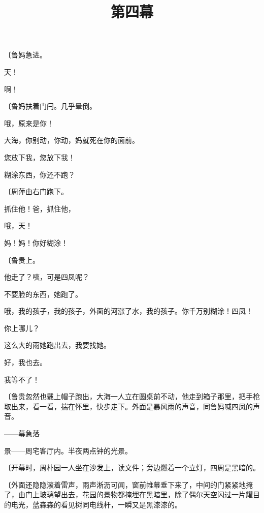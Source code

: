 {\fangsong〔鲁妈急进。}

天！

啊！

{\fangsong〔鲁妈扶着门闩。几乎晕倒。}

哦，原来是你！

大海，你别动，你动，妈就死在你的面前。

您放下我，您放下我！

糊涂东西，你还不跑？

{\fangsong〔周萍由右门跑下。}

抓住他！爸，抓住他，

哦，天！

妈！妈！你好糊涂！

{\fangsong〔鲁贵上。}

他走了？咦，可是四凤呢？

不要脸的东西，她跑了。

哦，我的孩子，我的孩子，外面的河涨了水，我的孩子。你千万别糊涂！四凤！

你上哪儿？

这么大的雨她跑出去，我要找她。

好，我也去。

我等不了！

{\fangsong〔鲁贵忽然也戴上帽子跑出，大海一人立在圆桌前不动，他走到箱子那里，把手枪取出来，看一看，揣在怀里，快步走下。外面是暴风雨的声音，同鲁妈喊四凤的声音。}

——幕急落

\title{第四幕}

景——周宅客厅内。半夜两点钟的光景。

{\fangsong〔开幕时，周朴园一人坐在沙发上，读文件；旁边燃着一个立灯，四周是黑暗的。}

{\fangsong〔外面还隐隐滚着雷声，雨声淅沥可闻，窗前帷幕垂下来了，中间的门紧紧地掩了，由门上玻璃望出去，花园的景物都掩埋在黑暗里，除了偶尔天空闪过一片耀目的电光，蓝森森的看见树同电线杆，一瞬又是黑漆漆的。}

